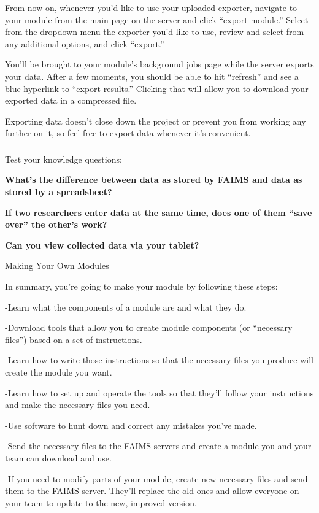 From now on, whenever you'd like to use your uploaded exporter, navigate to your module from the main page on the server and click “export module.” Select from the dropdown menu the exporter you'd like to use, review and select from any additional options, and click “export.”

You'll be brought to your module's background jobs page while the server exports your data. After a few moments, you should be able to hit “refresh” and see a blue hyperlink to “export results.” Clicking that will allow you to download your exported data in a compressed file.

Exporting data doesn't close down the project or prevent you from working any further on it, so feel free to export data whenever it's convenient.

\subsubsection[section-1]{}

Test your knowledge questions:

{\bf What's the difference between data as stored by FAIMS and data as stored by a spreadsheet?}

{\bf If two researchers enter data at the same time, does one of them “save over” the other's work?}

{\bf Can you view collected data via your tablet?}

Making Your Own Modules

In summary, you're going to make your module by following these steps:

-Learn what the components of a module are and what they do.

-Download tools that allow you to create module components (or “necessary files”) based on a set of instructions.

-Learn how to write those instructions so that the necessary files you produce will create the module you want.

-Learn how to set up and operate the tools so that they'll follow your instructions and make the necessary files you need.

-Use software to hunt down and correct any mistakes you've made.

-Send the necessary files to the FAIMS servers and create a module you and your team can download and use.

-If you need to modify parts of your module, create new necessary files and send them to the FAIMS server. They'll replace the old ones and allow everyone on your team to update to the new, improved version.


